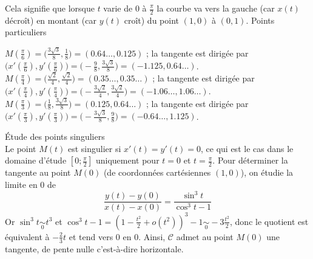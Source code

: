 {\begin{enumerate}
{\begin{itemize}
Cela signifie que lorsque $t$ varie de $0$ à $\frac\pi2$ la courbe va vers la gauche (car $x(t)$ décroît)
en montant (car $y(t)$ croît) du point $(1,0)$ à $(0,1)$.
Points particuliers\\
  \begin{itemize}
$M(\frac\pi6) = \big(\frac{3\sqrt3}{8},\frac18\big) = (0.64\ldots,0.125) $ ; 
    la tangente est dirigée par $\big(x'(\frac\pi6),y'(\frac\pi6)\big) = \big(-\frac98,\frac{3\sqrt3}{8} \big) = (-1.125,0.64\ldots)$.
$M(\frac\pi4) = \big(\frac{\sqrt2}{4},\frac{\sqrt2}{4}\big) = (0.35\ldots,0.35\ldots)$ ; 
    la tangente est dirigée par $\big(x'(\frac\pi4),y'(\frac\pi4)\big) = \big(-\frac{3\sqrt2}{4},\frac{3\sqrt2}{4}\big) = (-1.06\ldots,1.06\ldots)$.
$M(\frac\pi3) =  \big(\frac18,\frac{3\sqrt3}{8}\big) = (0.125,0.64\ldots)$ ;
    la tangente est dirigée par $\big(x'(\frac\pi3),y'(\frac\pi3)\big) = \big(-\frac{3\sqrt3}{8},\frac98\big) = (-0.64\ldots,1.125)$. 
  \end{itemize}
\'Etude des points singuliers\\
Le point $M(t)$ est singulier si $x'(t)=y'(t)=0$, ce qui est le cas dans le domaine d'étude $[0;\frac{\pi}{2}]$ uniquement pour $t=0$ et $t=\frac{\pi}{2}$. Pour déterminer la tangente au point $M(0)$ (de coordonnées cartésiennes $(1,0)$), on étudie la limite en 0 de 
$$\frac{y(t)-y(0)}{x(t)-x(0)}=\frac{\sin^3t}{\cos^3t-1}$$ 
Or $\sin^3t\underset{0}{\sim}t^3$ et $\cos^3t-1=(1-\frac{t^2}{2}+o(t^2))^3-1\underset{0}{\sim}-3\frac{t^2}{2}$, donc le quotient est équivalent à $-\frac{2}{3}t$ et tend vers 0 en 0. Ainsi, $\mathcal{C}$ admet au point $M(0)$ une tangente, de pente nulle c'est-à-dire horizontale.
\end{itemize}

\begin{center}
\end{center}}
\end{enumerate}}
